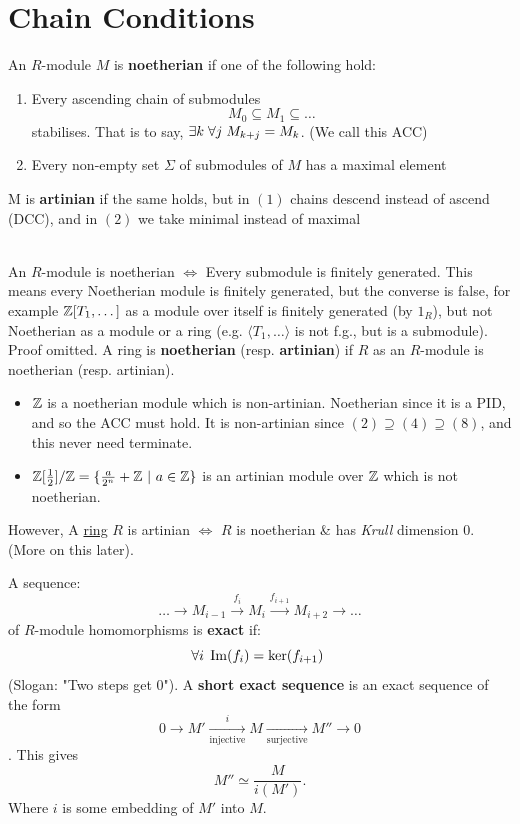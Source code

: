 \documentclass{article}
\begin{document}
\section{Chain Conditions}
\begin{fancydefine}
    An $R$-module $M$ is \textbf{noetherian} if one of the following hold:
    \begin{enumerate}
        \item Every ascending chain of submodules \[ M_{0} \subseteq M_{1} \subseteq \dots\] stabilises. That is to say, $\exists k \hspace{0.1cm} \forall j \hspace{0.1cm} M_{k+j}=M_{k}$. (We call this ACC)
        \item Every non-empty set $\Sigma$ of submodules of $M$ has a maximal element
    \end{enumerate}
    M is \textbf{artinian} if the same holds, but in $(1)$ chains descend instead of ascend (DCC), and in $(2)$ we take minimal instead of maximal
\end{fancydefine}
\lem \hspace{0.1cm} \\ An $R$-module is noetherian $\Leftrightarrow$ Every submodule is finitely generated.\gap
This means every Noetherian module is finitely generated, but the converse is false, for example $\mathbb{Z}[T_{1},\dots]$ as a module over itself is finitely generated (by $1_{R}$), but not Noetherian as a module or a ring (e.g. $\langle T_{1},\dots \rangle $ is not f.g., but is a submodule). \gap
Proof omitted.
 A ring is \textbf{noetherian} (resp. \textbf{artinian}) if $R$ as an $R$-module is noetherian (resp. artinian).
\ex \hspace{0.1cm}
\begin{itemize}
    \item $\mathbb{Z}$ is a noetherian module which is non-artinian. Noetherian since it is a PID, and so the ACC must hold. It is non-artinian since $(2) \supseteq (4) \supseteq (8)$, and this never need terminate.
    \item  $\mathbb{Z} [\frac{1}{2} ] / \mathbb{Z} = \{ \frac{a}{2^{n}} + \mathbb{Z} \text{ } | \text{ }{a \in \mathbb{Z}} \}$ is an artinian module over $\mathbb{Z}$ which is not noetherian.
\end{itemize}
However, A \underline{ring} $R$ is artinian $\Leftrightarrow$ $R$ is noetherian \& has \textit{Krull} dimension $0$. (More on this later).
\begin{fancydefine}
    A sequence: \[
    \dotsc \rightarrow M_{i-1} \xrightarrow{f_{i}} M_{i} \xrightarrow{f_{i+1}} M_{i+2} \rightarrow \dotsc \]
    of $R$-module homomorphisms is \textbf{exact} if:
    \[
    \forall i \hspace{0.1cm}\Im(f_{i}) = \ker(f_{i+1}) \hspace{0.1cm} \]
    (Slogan: "Two steps get $0$").\gap
    A \textbf{short exact sequence} is an exact sequence of the form \[
    0 \rightarrow M' \xrightarrow[\text{injective}]{i} M \xrightarrow[\text{surjective}]{} M'' \rightarrow 0\].
    This gives \[
    M'' \simeq \dfrac{M}{i(M')}.\] Where $i$ is some embedding of $M'$ into $M$.
\end{fancydefine}
\end{document}
